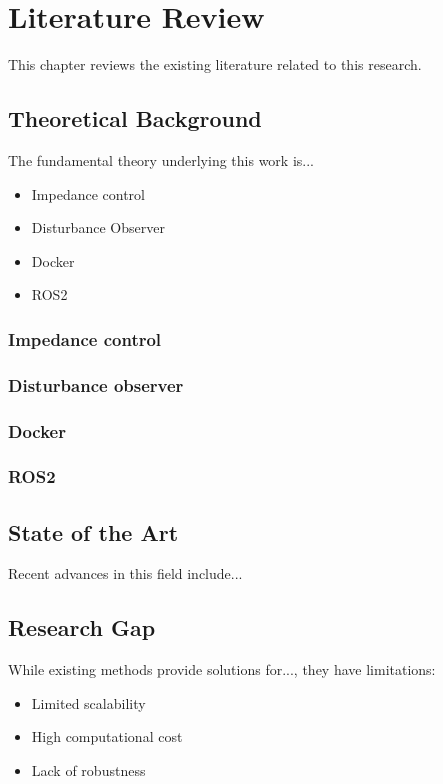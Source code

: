 \documentclass[11pt,a4paper,twoside,openright]{book}
\begin{document}
\chapter{Literature Review}
\label{ch:literature}

This chapter reviews the existing literature related to this research.

\section{Theoretical Background}

The fundamental theory underlying this work is...
\begin{itemize}
    \item Impedance control
    \item Disturbance Observer
    \item Docker
    \item ROS2
\end{itemize}

\subsection{Impedance control}
\subsection{Disturbance observer}
\subsection{Docker}
\subsection{ROS2}

\section{State of the Art}

Recent advances in this field include...
\section{Research Gap}

While existing methods provide solutions for..., they have limitations:
\begin{itemize}
    \item Limited scalability
    \item High computational cost
    \item Lack of robustness
\end{itemize}
\end{document}
